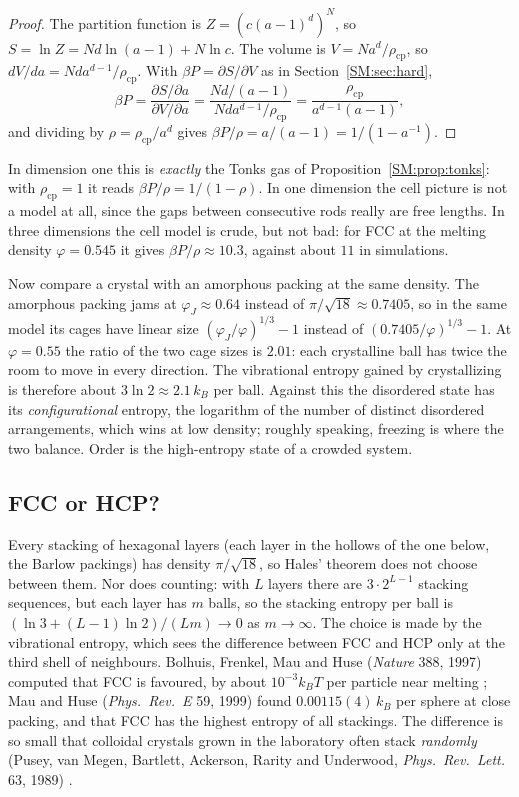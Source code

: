 \begin{proof}
The partition function is $Z=(c(a-1)^d)^N$, so $S=\ln Z=Nd\ln(a-1)+N\ln c$. The volume is
$V=Na^d/\rho_{\mathrm{cp}}$, so $dV/da=Nda^{d-1}/\rho_{\mathrm{cp}}$. With $\beta P=\partial S/\partial V$ as in
Section~\ref{SM:sec:hard},
\[
  \beta P=\frac{\partial S/\partial a}{\partial V/\partial a}=\frac{Nd/(a-1)}{Nda^{d-1}/\rho_{\mathrm{cp}}}
  =\frac{\rho_{\mathrm{cp}}}{a^{d-1}(a-1)},
\]
and dividing by $\rho=\rho_{\mathrm{cp}}/a^d$ gives $\beta P/\rho=a/(a-1)=1/(1-a^{-1})$.
\end{proof}

In dimension one this is \emph{exactly} the Tonks gas of Proposition~\ref{SM:prop:tonks}: with
$\rho_{\mathrm{cp}}=1$ it reads $\beta P/\rho=1/(1-\rho)$. In one dimension the cell picture is not a
model at all, since the gaps between consecutive rods really are free lengths. In three dimensions the
cell model is crude, but not bad: for FCC at the melting density $\varphi=0.545$ it gives
$\beta P/\rho\approx10.3$, against about $11$ in simulations.

Now compare a crystal with an amorphous packing at the same density. The amorphous packing jams at
$\varphi_J\approx0.64$ instead of $\pi/\sqrt{18}\approx0.7405$, so in the same model its cages have linear size
$(\varphi_J/\varphi)^{1/3}-1$ instead of $(0.7405/\varphi)^{1/3}-1$. At $\varphi=0.55$ the ratio of the two cage sizes
is $2.01$: each crystalline ball has twice the room to move in every direction. The vibrational entropy
gained by crystallizing is therefore about $3\ln2\approx2.1\,k_B$ per ball. Against this the disordered
state has its \emph{configurational} entropy, the logarithm of the number of distinct disordered
arrangements, which wins at low density; roughly speaking, freezing is where the two balance. Order is the high-entropy state of a crowded system.

\subsection*{FCC or HCP?}
Every stacking of hexagonal layers (each layer in the hollows of the one below, the Barlow packings)
has density $\pi/\sqrt{18}$, so Hales' theorem does not choose between them. Nor does counting: with $L$
layers there are $3\cdot2^{L-1}$ stacking sequences, but each layer has $m$ balls, so the stacking entropy
per ball is $(\ln3+(L-1)\ln2)/(Lm)\to0$ as $m\to\infty$. The choice is made by the vibrational entropy,
which sees the difference between FCC and HCP only at the third shell of neighbours. Bolhuis, Frenkel,
Mau and Huse (\emph{Nature} 388, 1997) computed that FCC is favoured, by about $10^{-3}k_BT$ per particle
near melting ; Mau and Huse (\emph{Phys.\ Rev.~E} 59, 1999) found $0.00115(4)\,k_B$ per sphere at close
packing, and that FCC has the highest entropy of all stackings. The difference is so small that colloidal
crystals grown in the laboratory often stack \emph{randomly} (Pusey, van Megen, Bartlett, Ackerson,
Rarity and Underwood, \emph{Phys.\ Rev.\ Lett.} 63, 1989) .

